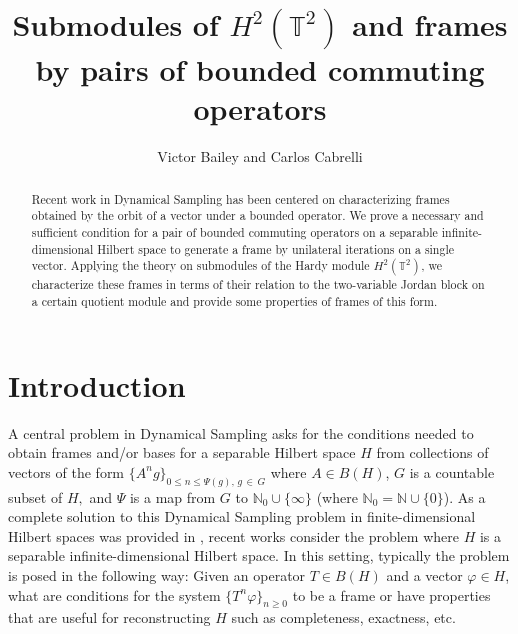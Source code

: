 \documentclass[12pt,reqno]{amsart}
\theoremstyle{definition}
\theoremstyle{definition}
\numberwithin{equation}{section}
\begin{document}
\title{Submodules of $H^2(\mathbb{T}^2)$ and frames by pairs of bounded commuting operators}

\author{Victor Bailey and Carlos Cabrelli}

\address{Department of Mathematics,
University of Oklahoma,
Norman, OK 73019 USA}


\address{Departmentamento de Matemática, Universidad de Buenos Aires, Instituto de Matemática ``Luis Santaló'' (IMAS-CONICET-UBA), Buenos Aires, Argentina}

\begin{abstract}
Recent work in Dynamical Sampling has been centered on characterizing frames  obtained by the orbit of a vector under a bounded operator. We prove a necessary and sufficient condition for a pair of bounded commuting operators on a separable infinite-dimensional Hilbert space to generate a frame by unilateral iterations on a single vector. Applying the theory on submodules of the Hardy module $H^2(\mathbb{T}^2)$, we characterize these frames in terms of their relation to the two-variable Jordan block on a certain quotient module and provide some properties of frames of this form. 
\end{abstract}
\maketitle
\section
{Introduction}


\quad A central problem in Dynamical Sampling  \cite{ACMT17} asks for the conditions needed to obtain frames and/or bases for a separable Hilbert space $H$ from collections of vectors of the form $\{A^n g\}_{{0 \leq n \leq \Psi (g)} , \, g \, \in \, G}$ 
where $A \in B(H)$, $G$ is a countable subset of $H,$ and $\Psi$ is a map from $G$ to $\mathbb{N}_0 \cup \{\infty\}$ (where $\mathbb{N}_0 = \mathbb{N} \cup \{0\}$).  As a complete solution to this Dynamical Sampling problem in finite-dimensional Hilbert spaces was provided in \cite{ACMT17}, recent works consider the problem where $H$ is a separable infinite-dimensional Hilbert space. In this setting, typically the problem is posed in the following way: Given an operator $T \in B(H)$ and a vector $\varphi \in H$, what are conditions for the system $\{T^n \varphi\}_{n \geq 0}$ to be a frame or have properties that are useful for reconstructing $H$ such as completeness, exactness, etc.
\end{document}
